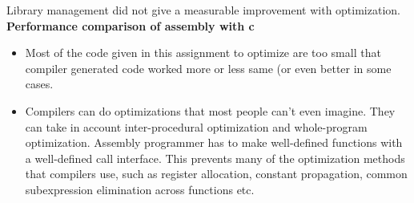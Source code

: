 \documentclass[paper=a4, fontsize=11pt]{scrartcl} %
\numberwithin{equation}{section} %
\numberwithin{figure}{section} %
\numberwithin{table}{section} %
\begin{document}
Library management did not give a measurable improvement with optimization.\\

\textbf{Performance comparison of assembly with c}

\begin{itemize}
\item Most of the code given in this assignment to optimize are too small that compiler generated code worked more or less same (or even better in some cases.

\item Compilers can do optimizations that most people can't even imagine. They can take in account inter-procedural optimization and whole-program optimization. Assembly programmer has to make well-defined functions with a well-defined call interface. This prevents many of the optimization methods that compilers use, such as register allocation, constant propagation, common subexpression elimination across functions etc.


\end{itemize}
\end{document}
